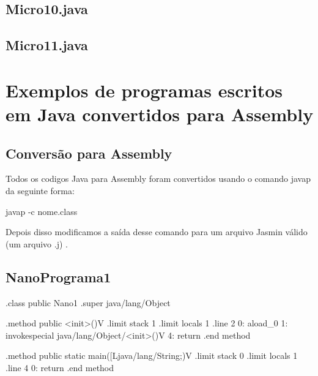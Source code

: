\documentclass[12pt,a4paper,twoside]{report}
\begin{document}
\section{Micro10.java}

\section{Micro11.java}



\chapter{Exemplos de programas escritos em Java convertidos para Assembly \label{ap:Testes}}
\section{Conversão para Assembly}
Todos os codigos Java para Assembly foram convertidos usando o comando javap da seguinte forma:
\begin{terminal}
javap -c nome.class
\end{terminal} 
Depois disso modificamos a saída desse comando para um arquivo Jasmin válido (um arquivo .j) .
\section{NanoPrograma1}
\begin{terminal}
.class public Nano1
.super java/lang/Object

.method public <init>()V
  .limit stack 1
  .limit locals 1
  .line 2
  0: aload_0
  1: invokespecial java/lang/Object/<init>()V
  4: return
.end method

.method public static main([Ljava/lang/String;)V
  .limit stack 0
  .limit locals 1
  .line 4
  0: return
.end method

\end{terminal}
\end{document}
